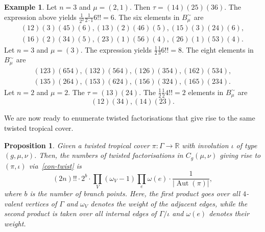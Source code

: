 \documentclass[10pt]{amsart}
\theoremstyle{plain}
\theoremstyle{definition}
\theoremstyle{definition}
\newtheorem{exam}[exam]{Example}
\theoremstyle{plain}
\theoremstyle{plain}
\newtheorem{prop}[prop]{Proposition}
\theoremstyle{remark}
\theoremstyle{plain}
\theoremstyle{plain}
\DeclareMathOperator{\Aut}{Aut}
\begin{document}
\begin{exam}
Let $n=3$ and $\mu=(2,1)$. Then $\tau=(14)(25)(36)$.
The expression above yields $\frac{1}{2^2}\frac{1}{2\cdot 1}6!! = 6$.
The six elements in $B^{\sim}_\mu$ are
\begin{gather*}
    (12)(3)(45)(6), (13)(2)(46)(5), (15)(3)(24)(6), \\
    (16)(2)(34)(5), (23)(1)(56)(4), (26)(1)(53)(4).
\end{gather*}
\noindent
Let $n=3$ and $\mu=(3)$. The expression yields $\frac{1}{2}\frac{1}{3}6!!= 8$.
The eight elements in $B^{\sim}_\mu$ are
\begin{gather*}
    (123)(654), (132)(564), (126)(354), (162)(534), \\ 
    (135)(264), (153)(624), (156)(324), (165)(234).
\end{gather*}
\noindent
Let $n=2$ and $\mu=2$. The $\tau=(13)(24)$. The $\frac{1}{2}\frac{1}{2}4!!=2$ elements in $B^{\sim}_\mu$ are
$$ (12)(34), (14)(23).$$
\end{exam}

We are now ready to enumerate twisted factorisations that give rise to the same twisted tropical cover.

\begin{prop}\label{thm-covermult}
Given a twisted tropical cover $\pi\colon\Gamma\to\mathbb{R}$ with involution $\iota$ of type $(g,\mu,\nu)$. Then, the numbers of twisted factorisations in $C_g(\mu,\nu)$ giving rise to $(\pi,\iota)$ via~\cref{con-twist} is
\begin{equation*}
(2n)!!\cdot 2^{b}\cdot \prod_V (\omega_V-1)\prod_e\omega(e)\cdot \frac{1}{|\Aut(\pi)|},
\end{equation*}
where $b$ is the number of branch points. Here, the first product goes over all $4$-valent vertices of $\Gamma$ and $\omega_V$ denotes the weight of the adjacent edges, while the second product is taken over all internal edges of $\Gamma/\iota$ and $\omega(e)$ denotes their weight.
\end{prop}
\end{document}
